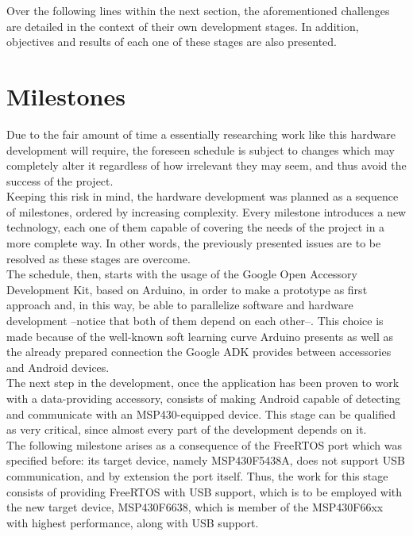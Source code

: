 	Over the following lines within the next section, the aforementioned challenges are detailed
	in the context of their own development stages. In addition, objectives and results of each one of
	these stages are also presented.
	
	\section{Milestones}	
	Due to the fair amount of time a essentially researching work like this hardware development will
	require, the foreseen schedule is subject to changes which may completely alter it regardless of 
	how irrelevant they may seem, and thus avoid the success of the project.\\
	
	Keeping this risk in mind, the hardware development was planned as a sequence of milestones,
	ordered by increasing complexity. Every milestone introduces a new technology, each one of them
	capable of covering the needs of the project in a more complete way. In other words, the previously
	presented issues are to be resolved as these stages are overcome.\\
	
	The schedule, then, starts with the usage of the Google Open Accessory Development Kit, based on Arduino,
	in order to make a prototype as first approach and, in this way, be able to parallelize software and
	hardware development --notice that both of them depend on each other--. This choice is made because of
	the well-known soft learning curve Arduino presents as well as the already prepared connection
	the Google ADK provides between accessories and Android devices.\\
	
	The next step in the development, once the application has been proven to work with a data-providing
	accessory, consists of making Android capable of detecting and communicate with an MSP430-equipped
	device. This stage can be qualified as very critical, since almost every part of the development
	depends on it.\\
	
	The following milestone arises as a consequence of the FreeRTOS port which was specified before: its
	target device, namely MSP430F5438A, does not support USB communication, and by extension the port itself.
	Thus, the work for this stage consists of providing FreeRTOS with USB support, which is to be employed
	with the new target device, MSP430F6638, which is member of the MSP430F66xx with highest performance,
	along with USB support.\\
	
